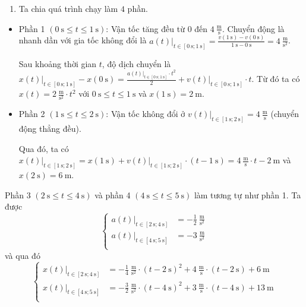\documentclass[a4paper, titlepage, openany]{book}
\newcounter{solution}
\begin{document}
\solution
\begin{enumerate}
   \item Ta chia quá trình chạy làm $4$ phần.
\end{enumerate}

\begin{itemize}
   \item Phần 1 $\left(0\ \text{s}\leq t \leq 1\ \text{s}\right)$: Vận tốc tăng đều từ $0$ đến $4\ \frac{\text{m}}{\text{s}}$. Chuyển động là nhanh dần với gia tốc không đổi là $\left.a(t)\right|_{t\in\left[0\ \text{s};1\ \text{s}\right]}=\frac{v(1\ \text{s})-v(0\ \text{s})}{1\ \text{s}-0\ \text{s}}=4\ \frac{\text{m}}{\text{s}^2}$.
   
Sau khoảng thời gian $t$, độ dịch chuyển là $\left.x(t)\right|_{t\in\left[0\ \text{s};1\ \text{s}\right]} - x(0\ \text{s}) = \frac{\left.a(t)\right|_{t\in\left[0\ \text{s};1\ \text{s}\right]}\cdot t^2}{2} + \left.v(t)\right|_{t\in\left[0\ \text{s};1\ \text{s}\right]}\cdot t$. Từ đó ta có $x(t) = 2\ \frac{\text{m}}{\text{s}^2}\cdot t^2$ với $0\ \text{s}\leq t \leq 1\ \text{s}$ và $x(1\ \text{s}) = 2\ \text{m}$.
   
   \item Phần 2 $\left(1\ \text{s}\leq t \leq 2\ \text{s}\right)$: Vận tốc không đổi ở $\left.v(t)\right|_{t\in\left[1\ \text{s};2\ \text{s}\right]} = 4\ \frac{\text{m}}{\text{s}}$ (chuyển động thẳng đều). 
   
Qua đó, ta có $\left.x(t)\right|_{t\in\left[1\ \text{s};2\ \text{s}\right]} = x(1\ \text{s}) + \left.v(t)\right|_{t\in\left[1\ \text{s};2\ \text{s}\right]}\cdot\left(t - 1\ \text{s}\right) = 4\ \frac{\text{m}}{\text{s}}\cdot t - 2\ \text{m}$ và $x(2\ \text{s}) = 6\ \text{m}$.
\end{itemize}

Phần 3 $\left(2\ \text{s}\leq t \leq 4\ \text{s}\right)$ và phần 4 $\left(4\ \text{s}\leq t \leq 5\ \text{s}\right)$ làm tương tự như phần 1. Ta được
\begin{equation*}
   \begin{cases}
     \left.a(t)\right|_{t\in\left[2\ \text{s};4\ \text{s}\right]} &= -\frac{1}{2}\ \frac{\text{m}}{\text{s}^2}\\
     \left.a(t)\right|_{t\in\left[4\ \text{s};5\ \text{s}\right]} &= -3\ \frac{\text{m}}{\text{s}^2}\\
   \end{cases}
\end{equation*}
và qua đó
\begin{equation*}
   \begin{cases}
     \left.x(t)\right|_{t\in\left[2\ \text{s};4\ \text{s}\right]} &= -\frac{1}{4}\ \frac{\text{m}}{\text{s}^2}\cdot\left(t - 2\ \text{s}\right)^2 + 4\ \frac{\text{m}}{\text{s}}\cdot \left(t - 2\ \text{s}\right) + 6\ \text{m}\\
     \left.x(t)\right|_{t\in\left[4\ \text{s};5\ \text{s}\right]} &= -\frac{3}{2}\ \frac{\text{m}}{\text{s}^2}\cdot\left(t - 4\ \text{s}\right)^2 + 3\ \frac{\text{m}}{\text{s}}\cdot \left(t - 4\ \text{s}\right) + 13\ \text{m}\\
   \end{cases}
\end{equation*}
\end{document}
